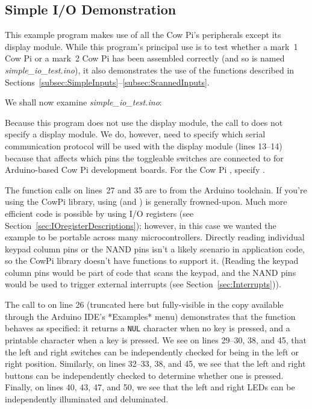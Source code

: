 \subsection{Simple I/O Demonstration}

    This example program makes use of all the Cow Pi's peripherals except its display module.
    While this program's principal use is to test whether a mark~1 Cow Pi or a mark~2 Cow Pi has been assembled correctly (and so is named \textit{simple\_io\_test.ino}), it also demonstrates the use of the functions described in Sections~\ref{subsec:SimpleInputs}--\ref{subsec:ScannedInputs}.

    We shall now examine \textit{simple\_io\_test.ino}:

    

    Because this program does not use the display module, the call to \hyperlink{function:cowpi_setup}{} does not specify a display module.
    We do, however, need to specify which serial communication protocol will be used with the display module (lines 13--14) because that affects which pins the toggleable switches are connected to for Arduino-based Cow Pi development boards.
    For the Cow Pi \cowpiversion, specify .

    The function calls on lines~27 and 35 are to  from the Arduino toolchain.
    If you're using the CowPi library, using  (and ) is generally frowned-upon.
    Much more efficient code is possible by using I/O registers (see Section~\ref{sec:IOregisterDescriptions});
    however, in this case we wanted the example to be portable across many microcontrollers.
    Directly reading individual keypad column pins or the NAND pins isn't a likely scenario in application code, so the CowPi library doesn't have functions to support it.
    (Reading the keypad column pins would be part of code that scans the keypad, and the NAND pins would be used to trigger external interrupts (see Section~\ref{sec:Interrupts})).

    The call to \hyperlink{function:cowpi_get_keypress}{} on line 26 (truncated here but fully-visible in the copy available through the Arduino IDE's *Examples* menu) demonstrates that the function behaves as specified: it returns a \texttt{NUL} character when no key is pressed, and a printable character when a key is pressed.
    We see on lines 29--30, 38, and 45, that the left and right switches can be independently checked for being in the left or right position.
    Similarly, on lines 32--33, 38, and 45, we see that the left and right buttons can be independently checked to determine whether one is pressed.
    Finally, on lines 40, 43, 47, and 50, we see that the left and right LEDs can be independently illuminated and deluminated.

